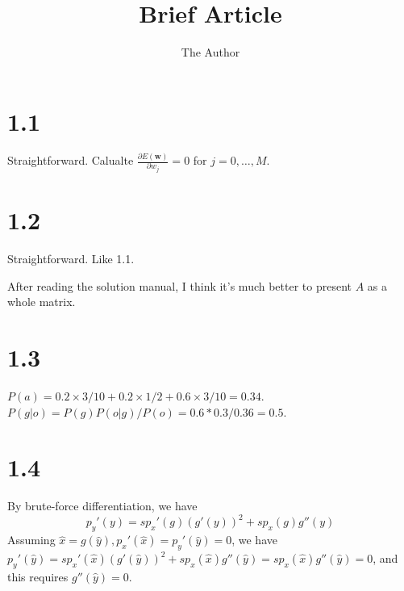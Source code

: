 \documentclass[12pt]{article}
\title{Brief Article}
\author{The Author}
\newcommand{\vect}[1]{\mathbf{#1}}
\begin{document}
\maketitle




\section{1.1}
Straightforward. Calualte $\frac{\partial E(\vect{w})}{\partial w_j}=0$ for $j=0,\ldots,M$.

\section{1.2}
Straightforward. Like 1.1.

After reading the solution manual, I think it's much better to present $A$ as a whole matrix.

\section{1.3}
$P(a) = 0.2 \times 3/10 + 0.2 \times 1/2 + 0.6 \times 3/10 = 0.34$. $P(g|o) = P(g) P(o|g)/P(o) = 0.6*0.3/0.36 = 0.5$.

\section{1.4}
By brute-force differentiation, we have
\begin{equation}
    p_y'(y) = s p_x'(g) {(g'(y))}^2 + s p_x(g) g''(y)
\end{equation}
Assuming $\widehat{x} = g(\widehat{y}), p_x'(\widehat{x}) = p_y'(\widehat{y})=0 $, we have $p_y'(\widehat{y}) = s p_x'(\widehat{x}) {(g'(\widehat{y}))}^2 + s p_x(\widehat{x}) g''(\widehat{y}) =  s p_x(\widehat{x}) g''(\widehat{y}) = 0$, and this requires $g''(\widehat{y})=0$.
\end{document}
